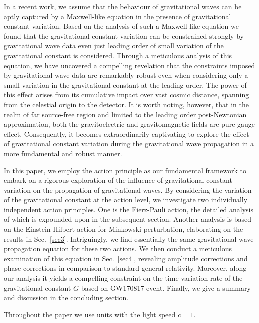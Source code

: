 \documentclass[prd,aps,a4paper,superscriptaddress,onecolumn,nofootinbib]{revtex4}
\begin{document}
In a recent work, we assume that the behaviour of gravitational waves can be aptly captured by a Maxwell-like equation in the presence of gravitational constant variation.
Based on the analysis of such a Maxwell-like equation we found that the gravitational constant variation can be constrained strongly by gravitational wave data even just leading order of small variation of the gravitational constant is considered.
Through a meticulous analysis of this equation, we have uncovered a compelling revelation that the constraints imposed by gravitational wave data are remarkably robust even when considering only a small variation in the gravitational constant at the leading order.
The power of this effect arises from its cumulative impact over vast cosmic distance, spanning from the celestial origin to the detector.
It is worth noting, however, that in the realm of far source-free region and limited to the leading order post-Newtonian approximation, both the gravitoelectric and gravitomagnetic fields are pure gauge effect.
Consequently, it becomes extraordinarily captivating to explore the effect of gravitational constant variation during the gravitational wave propagation in a more fundamental and robust manner.


In this paper, we employ the action principle as our fundamental framework to embark on a rigorous exploration of the influence of gravitational constant variation on the propagation of gravitational waves.
By considering the variation of the gravitational constant at the action level, we investigate two individually independent action principles.
One is the Fierz-Pauli action, the detailed analysis of which is expounded upon in the subsequent section. Another analysis is based on the Einstein-Hilbert action for Minkowski perturbation, elaborating on the results in Sec.~\ref{sec3}.
Intriguingly, we find essentially the same gravitational wave propagation equation for these two actions.
We then conduct a meticulous examination of this equation in Sec.~\ref{sec4}, revealing amplitude corrections and phase corrections in comparison to standard general relativity.
Moreover, along our analysis it yields a compelling constraint on the time variation rate of the gravitational constant $G$ based on GW170817 event.
Finally, we give a summary and discussion in the concluding section.

Throughout the paper we use units with the light speed $c=1$.
\end{document}
